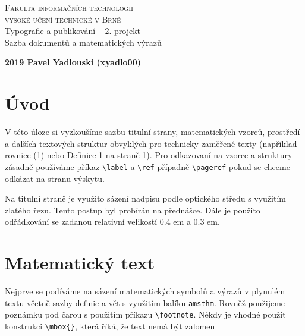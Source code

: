 \documentclass[11pt, a4paper, twocolumn]{article}
\begin{document}

\begin{titlepage}
    \begin{center}
        \textsc{\Huge Fakulta informačních technologii\\\vspace{0.4em}
        vysoké učení technické v Brně}\\
        {\LARGE Typografie a publikování -- 2. projekt\\\vspace{0.3em}
        Sazba dokumentů a matematických výrazů}\\
    \end{center}
    \begin{flushleft}
        \textbf{\Large{2019
        \hfill
        Pavel Yadlouski (xyadlo00)}}
    \end{flushleft}
    
\end{titlepage}

\newpage
\section*{Úvod}
    V této úloze si vyzkoušíme sazbu titulní strany, matematických vzorců, prostředí a dalších textových struktur obvyklých pro technicky zaměřené texty (například rovnice (1)
nebo Definice 1 na straně 1). Pro odkazovaní na vzorce
a struktury zásadně používáme příkaz \texttt{\textbackslash label} a \texttt{\textbackslash ref} případně \texttt{\textbackslash pageref} pokud se chceme odkázat na stranu výskytu.

Na titulní straně je využito sázení nadpisu podle optického středu s využitím zlatého řezu. Tento postup byl
probírán na přednášce. Dále je použito odřádkování se
zadanou relativní velikostí 0.4 em a 0.3 em.


\section{Matematický text}
Nejprve se podíváme na sázení matematických symbolů
a výrazů v plynulém textu včetně sazby definic a vět s využitím balíku \texttt{amsthm}. Rovněž použijeme poznámku pod čarou s použitím příkazu \texttt{\textbackslash footnote}. Někdy je vhodné použít konstrukci \texttt{\textbackslash mbox\{\}}, která říká, že text nemá být zalomen
\end{document}
